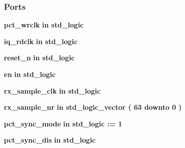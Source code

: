 \subsubsection*{Ports}
 \begin{DoxyCompactItemize}
\item 
{\bf pct\+\_\+wrclk}  {\bfseries {\bfseries \textcolor{keywordflow}{in}\textcolor{vhdlchar}{ }}} {\bfseries \textcolor{comment}{std\+\_\+logic}\textcolor{vhdlchar}{ }} 
\item 
{\bf iq\+\_\+rdclk}  {\bfseries {\bfseries \textcolor{keywordflow}{in}\textcolor{vhdlchar}{ }}} {\bfseries \textcolor{comment}{std\+\_\+logic}\textcolor{vhdlchar}{ }} 
\item 
{\bf reset\+\_\+n}  {\bfseries {\bfseries \textcolor{keywordflow}{in}\textcolor{vhdlchar}{ }}} {\bfseries \textcolor{comment}{std\+\_\+logic}\textcolor{vhdlchar}{ }} 
\item 
{\bf en}  {\bfseries {\bfseries \textcolor{keywordflow}{in}\textcolor{vhdlchar}{ }}} {\bfseries \textcolor{comment}{std\+\_\+logic}\textcolor{vhdlchar}{ }} 
\item 
{\bf rx\+\_\+sample\+\_\+clk}  {\bfseries {\bfseries \textcolor{keywordflow}{in}\textcolor{vhdlchar}{ }}} {\bfseries \textcolor{comment}{std\+\_\+logic}\textcolor{vhdlchar}{ }} 
\item 
{\bf rx\+\_\+sample\+\_\+nr}  {\bfseries {\bfseries \textcolor{keywordflow}{in}\textcolor{vhdlchar}{ }}} {\bfseries \textcolor{comment}{std\+\_\+logic\+\_\+vector}\textcolor{vhdlchar}{ }\textcolor{vhdlchar}{(}\textcolor{vhdlchar}{ }\textcolor{vhdlchar}{ } \textcolor{vhdldigit}{63} \textcolor{vhdlchar}{ }\textcolor{keywordflow}{downto}\textcolor{vhdlchar}{ }\textcolor{vhdlchar}{ } \textcolor{vhdldigit}{0} \textcolor{vhdlchar}{ }\textcolor{vhdlchar}{)}\textcolor{vhdlchar}{ }} 
\item 
{\bf pct\+\_\+sync\+\_\+mode}  {\bfseries {\bfseries \textcolor{keywordflow}{in}\textcolor{vhdlchar}{ }}} {\bfseries \textcolor{comment}{std\+\_\+logic}\textcolor{vhdlchar}{ }\textcolor{vhdlchar}{ }\textcolor{vhdlchar}{\+:}\textcolor{vhdlchar}{=}\textcolor{vhdlchar}{ }\textcolor{vhdlchar}{ }\textcolor{vhdlchar}{\textquotesingle{}}\textcolor{vhdlchar}{ } \textcolor{vhdldigit}{1} \textcolor{vhdlchar}{ }\textcolor{vhdlchar}{\textquotesingle{}}\textcolor{vhdlchar}{ }} 
\item 
{\bf pct\+\_\+sync\+\_\+dis}  {\bfseries {\bfseries \textcolor{keywordflow}{in}\textcolor{vhdlchar}{ }}} {\bfseries \textcolor{comment}{std\+\_\+logic}\textcolor{vhdlchar}{ }} 
\item 

\end{DoxyCompactItemize}
